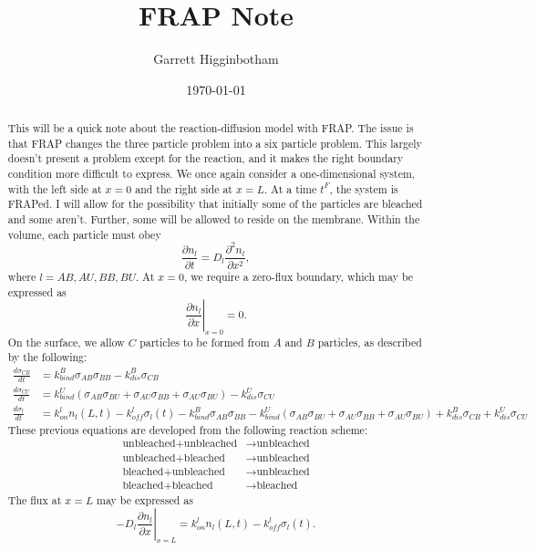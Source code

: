 \documentclass[aps, prl, preprint]{revtex4-1}
\begin{document}
\title{FRAP Note}
\author{Garrett Higginbotham}
\date{\today}

\begin{abstract}
This will be a quick note about the reaction-diffusion model with FRAP. The issue is that FRAP changes the three particle problem into a six particle problem. This largely doesn't present a problem except for the reaction, and it makes the right boundary condition more difficult to express. We once again consider a one-dimensional system, with the left side at $x=0$ and the right side at $x=L$. At a time $t^F$, the system is FRAPed. I will allow for the possibility that initially some of the particles are bleached and some aren't. Further, some will be allowed to reside on the membrane. Within the volume, each particle must obey $$ \frac{\partial n_l}{\partial t} = D_l \frac{\partial^2 n_l}{\partial x^2},$$ where $l = AB, AU, BB, BU$. At $x=0$, we require a zero-flux boundary, which may be expressed as $$\left . \frac{\partial n_l}{\partial x} \right |_{x = 0} = 0.$$ On the surface, we allow $C$ particles to be formed from $A$ and $B$ particles, as described by the following:
\begin{align*}
\frac{d \sigma_{CB}}{dt} &= k_{bind}^B\sigma_{AB}\sigma_{BB} - k_{dis}^B\sigma_{CB}\\
\frac{d \sigma_{CU}}{dt} &= k_{bind}^U(\sigma_{AB}\sigma_{BU}+\sigma_{AU}\sigma_{BB}+\sigma_{AU}\sigma_{BU}) - k_{dis}^U\sigma_{CU}\\
\frac{d\sigma_l}{dt} &= k_{on}^ln_l(L,t) - k_{off}^l\sigma_l(t) - k_{bind}^B\sigma_{AB}\sigma_{BB} -k_{bind}^U(\sigma_{AB}\sigma_{BU}+\sigma_{AU}\sigma_{BB}+\sigma_{AU}\sigma_{BU}) + k_{dis}^B\sigma_{CB}+k_{dis}^U\sigma_{CU}
\end{align*}
These previous equations are developed from the following reaction scheme:
\begin{align*}
\text{unbleached} + \text{unbleached} &\rightarrow \text{unbleached}\\
\text{unbleached} + \text{bleached} &\rightarrow \text{unbleached}\\
\text{bleached} + \text{unbleached} &\rightarrow \text{unbleached}\\
\text{bleached} + \text{bleached} &\rightarrow \text{bleached}
\end{align*}
The flux at $x = L$ may be expressed as $$\left .-D_l\frac{\partial n_l}{\partial x}\right |_{x=L} = k_{on}^l n_l(L,t) - k_{off}^l \sigma_l(t).$$
\end{abstract}

\maketitle
\end{document}
